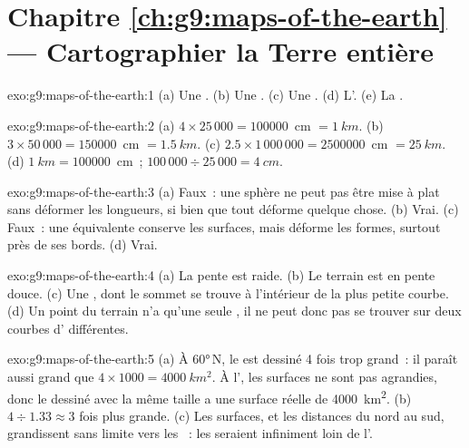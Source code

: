 \section*{Chapitre \ref{ch:g9:maps-of-the-earth} --- Cartographier la Terre entière}

\begin{solution}{exo:g9:maps-of-the-earth:1}
(a) Une . (b) Une . (c) Une
. (d) L'. (e) La .
\end{solution}

\begin{solution}{exo:g9:maps-of-the-earth:2}
(a) $4 \times 25\,000 = \num{100000}$~cm $= \qty{1}{km}$. (b) $3 \times
50\,000 = \num{150000}$~cm $= \qty{1.5}{km}$. (c) $2.5 \times 1\,000\,000
= \num{2500000}$~cm $= \qty{25}{km}$. (d) $\qty{1}{km} = \num{100000}$~cm~;
$100\,000 \div 25\,000 = \qty{4}{cm}$.
\end{solution}

\begin{solution}{exo:g9:maps-of-the-earth:3}
(a) Faux~: une sphère ne peut pas être mise à plat sans déformer les
longueurs, si bien que tout  déforme quelque chose. (b) Vrai.
(c) Faux~: une  équivalente conserve les surfaces, mais déforme les
formes, surtout près de ses bords. (d) Vrai.
\end{solution}

\begin{solution}{exo:g9:maps-of-the-earth:4}
(a) La pente est raide. (b) Le terrain est en pente douce. (c) Une
, dont le sommet se trouve à l'intérieur de la plus petite courbe.
(d) Un point du terrain n'a qu'une seule , il ne peut donc pas se
trouver sur deux courbes d' différentes.
\end{solution}

\begin{solution}{exo:g9:maps-of-the-earth:5}
(a) À \ang{60}\,N, le  est dessiné 4 fois trop grand~: il paraît aussi
grand que $4 \times 1000 = \qty{4000}{km^2}$. À l', les surfaces ne
sont pas agrandies, donc le  dessiné avec la même taille a une surface
réelle de \qty{4000}{km^2}. (b) $4 \div 1.33 \approx 3$ fois plus grande.
(c) Les surfaces, et les distances du nord au sud, grandissent sans limite
vers les ~: les  seraient infiniment loin de l'.
\end{solution}


